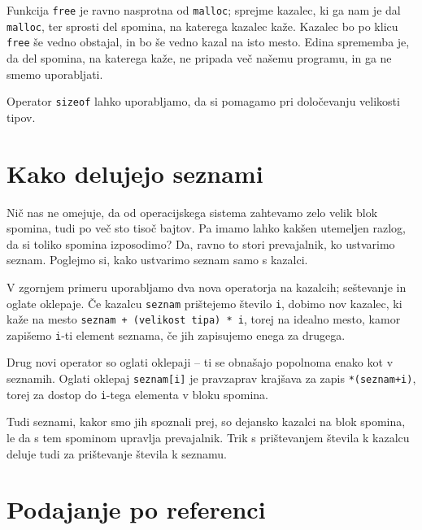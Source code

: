 Funkcija \verb+free+ je ravno nasprotna od \verb+malloc+; sprejme kazalec, ki ga
nam je dal \verb+malloc+, ter sprosti del spomina, na katerega kazalec kaže.
Kazalec bo po klicu \verb+free+ še vedno obstajal, in bo še vedno kazal na isto
mesto. Edina sprememba je, da del spomina, na katerega kaže, ne pripada več
našemu programu, in ga ne smemo uporabljati.

\begin{examples}
  Operator \verb+sizeof+ lahko uporabljamo, da si pomagamo pri določevanju
  velikosti tipov.
\end{examples}

\newpage
\section{Kako delujejo seznami}

Nič nas ne omejuje, da od operacijskega sistema zahtevamo zelo velik blok
spomina, tudi po več sto tisoč bajtov. Pa imamo lahko kakšen utemeljen razlog,
da si toliko spomina izposodimo? Da, ravno to stori prevajalnik, ko ustvarimo
seznam. Poglejmo si, kako ustvarimo seznam samo s kazalci.

\begin{examples}
\end{examples}

V zgornjem primeru uporabljamo dva nova operatorja na kazalcih; seštevanje in
oglate oklepaje. Če kazalcu \verb+seznam+ prištejemo število \verb+i+, dobimo
nov kazalec, ki kaže na mesto \verb|seznam + (velikost tipa) * i|, torej na
idealno mesto, kamor zapišemo \verb+i+-ti element seznama, če jih zapisujemo
enega za drugega.

Drug novi operator so oglati oklepaji -- ti se obnašajo popolnoma enako kot
v seznamih. Oglati oklepaj \verb+seznam[i]+ je pravzaprav krajšava za zapis
\verb|*(seznam+i)|, torej za dostop do \verb+i+-tega elementa v bloku spomina.

Tudi seznami, kakor smo jih spoznali prej, so dejansko kazalci na blok spomina,
le da s tem spominom upravlja prevajalnik. Trik s prištevanjem števila k
kazalcu deluje tudi za prištevanje števila k seznamu.

\section{Podajanje po referenci}

